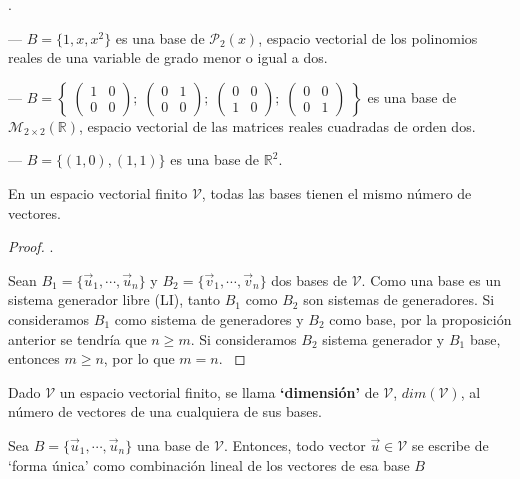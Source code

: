 \begin{ejem}.

--- $B=\{1,x,x^2\}$ es una base de $\mathcal P_2(x)$, espacio vectorial de los polinomios reales de una variable de grado menor o igual a dos.	

--- $B= \left\{\; 
\left(\begin{matrix} 1&0\\0&0\end{matrix} \right);\;
\left(\begin{matrix} 0&1\\0&0 \end{matrix} \right);\;
\left(\begin{matrix} 0&0\\1&0\end{matrix} \right); \; 
\left(\begin{matrix} 0&0\\0&1 \end{matrix} \right) \;\right\}$ es una base de $\mathcal M_{2 \times 2}(\mathbb R)$, espacio vectorial de las matrices reales cuadradas de orden dos.

--- $B=\{(1,0), (1,1)\}$ es una base de $\mathbb R^2$.
\end{ejem}

\begin{teor} En un espacio vectorial finito $\mathcal V$, todas las bases tienen el mismo número de vectores.	
\end{teor}

\begin{proof}.

\noindent \textcolor{gris}{ Sean $B_1=\{ \vec u_1, \cdots , \vec u_n\}$ y  $B_2=\{ \vec v_1, \cdots , \vec v_n\}$   dos bases de $\mathcal V$. Como una base es un sistema generador libre (LI), tanto $B_1$ como $B_2$ son sistemas de generadores. Si consideramos $B_1$ como sistema de generadores y $B_2$ como base, por la proposición anterior se tendría que $n\ge m$. Si consideramos $B_2$ sistema generador y $B_1$ base, entonces $m\ge n$, por lo que $m=n$. }
	
\end{proof}

\begin{defi}
Dado $\mathcal V$ un espacio vectorial finito, se	llama \textbf{`dimensión'} de  $\mathcal V$,  $dim(\mathcal V)$, al número de vectores de una cualquiera de sus bases.
\end{defi}


\begin{prop}
Sea $B=\{\vec u_1, \cdots, \vec u_n \}$ una base de $\mathcal V$. Entonces, todo vector $\vec u \in \mathcal V$ se escribe de `forma única'	como combinación lineal de los vectores de esa base $B$
\end{prop}

